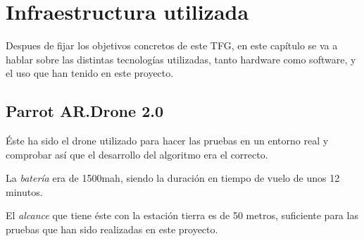 \chapter{Infraestructura utilizada}\label{cap.infraestructura}
\hspace{1 cm} Despues de fijar los objetivos concretos de este TFG, en este cap\'itulo se va a hablar sobre las distintas tecnolog\'ias utilizadas, tanto hardware como software, y el uso que han tenido en este proyecto. 

\section{Parrot AR.Drone 2.0 }
\hspace{1 cm} \'Este ha sido el drone utilizado para hacer las pruebas en un entorno real y comprobar as\'i que el desarrollo del algoritmo era el correcto. 

\hspace{1 cm} La \textsl{bater\'ia} era de 1500mah, siendo la duraci\'on en tiempo de vuelo de unos 12 minutos. %

\hspace{1 cm} El \textsl{alcance} que tiene \'este con la estaci\'on tierra es de 50 metros, suficiente para las pruebas que han sido realizadas en este proyecto. 

